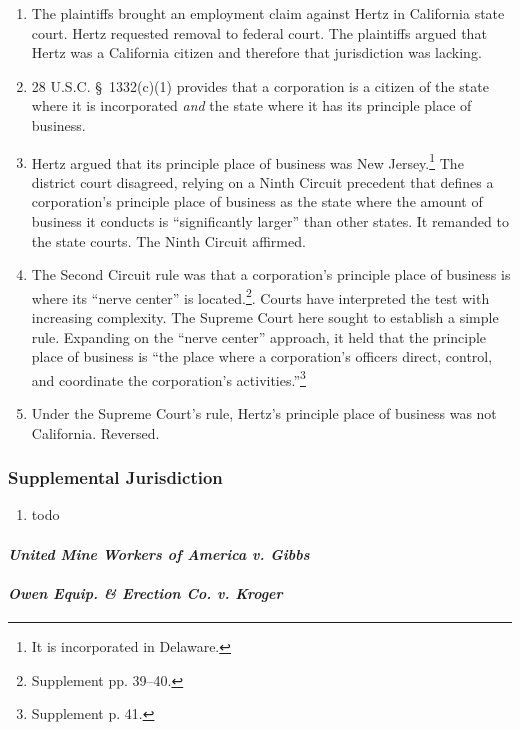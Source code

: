 \begin{enumerate}
    \item The plaintiffs brought an employment claim against Hertz in California state court. Hertz requested removal to federal court. The plaintiffs argued that Hertz was a California citizen and therefore that jurisdiction was lacking.
    \item 28 U.S.C. \S\ 1332(c)(1) provides that a corporation is a citizen of the state where it is incorporated \emph{and} the state where it has its principle place of business.
    \item Hertz argued that its principle place of business was New Jersey.\footnote{It is incorporated in Delaware.} The district court disagreed, relying on a Ninth Circuit precedent that defines a corporation's principle place of business as the state where the amount of business it conducts is ``significantly larger'' than other states. It remanded to the state courts. The Ninth Circuit affirmed.
    \item The Second Circuit rule was that a corporation's principle place of business is where its ``nerve center'' is located.\footnote{Supplement pp. 39--40.}. Courts have interpreted the test with increasing complexity. The Supreme Court here sought to establish a simple rule. Expanding on the ``nerve center'' approach, it held that the principle place of business is ``the place where a corporation's officers direct, control, and coordinate the corporation's activities.''\footnote{Supplement p. 41.}
    \item Under the Supreme Court's rule, Hertz's principle place of business was not California. Reversed.
\end{enumerate}

\subsubsection{Supplemental Jurisdiction}

\begin{enumerate}
    \item todo
\end{enumerate}

\paragraph{\emph{United Mine Workers of America v. Gibbs}} %
\paragraph{\emph{Owen Equip. \& Erection Co. v. Kroger}} %

